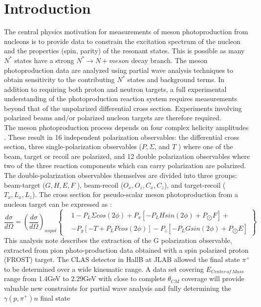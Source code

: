 \section{Introduction}
The central physics motivation for measurements of meson photoproduction from nucleons is to provide data to constrain the excitation spectrum of the nucleon and the properties (spin, parity) of the resonant states.  This is possible as many $N^*$ states have a strong $N^*\rightarrow N + meson$  decay branch.  The meson photoproduction data are analyzed using partial wave analysis techniques to obtain sensitivity to the contributing $N^*$ states and background terms.
In addition to requiring both proton and neutron targets, a full experimental understanding of the photoproduction reaction system requires measurements
beyond that of the unpolarized differential cross section. Experiments involving polarized beams and/or polarized nucleon targets are therefore required. \\
The meson photoproduction process depends on four complex helicity amplitudes \cite{PhysRev.106.1337} \cite{PhysRev.106.1345}. These result in 16 independent polarization observables: the differential cross section, three single-polarization observables ($P, \Sigma$, and $T$ ) where one of the beam, target
or recoil are polarized, and 12 double polarization observables where two of the three reaction components which can carry polarization are polarized. The
double-polarization observables themselves are divided into three groups: beam-target ($G, H, E, F$ ), beam-recoil ($O_x , O_z, C_x , C_z$), and target-recoil ($T_x , L_x , L_z$).
The cross section for pseudo-scalar meson photoproduction from a nucleon target can be expressed as \cite{Bark_1974}:
\begin{equation}
\frac{d\sigma}{d\Omega} = \left(\frac{d\sigma}{d\Omega} \right)_{unpol}  \left\{ 
\begin{aligned}
    & 1 - P_L \Sigma cos(2\phi) + P_x \left[-P_L H sin(2\phi) + P_{\bigodot}F\right] + \\
& -P_y \left[ -T +P_L P cos(2\phi)\right] -P_z \left[-P_L G sin(2\phi) + P_{\bigodot}E\right]
\end{aligned}
\right\} 
\label{eqn:CGLN}
\end{equation}
This analysis note describes the extraction of the G polarization observable, extracted from pion photo-production data obtained with a spin polarized proton (FROST) target. The CLAS detector in HallB at JLAB allowed the final state $\pi^+$ to be determined over a wide kinematic range. A data set covering $E_{Center\, of\, Mass}$ range from 1.4GeV to 2.29GeV with close to complete $\theta_{CM}$ coverage will provide valuable new constraints for partial wave analysis and fully determining the $\gamma (p,\pi^+)n$ final state
